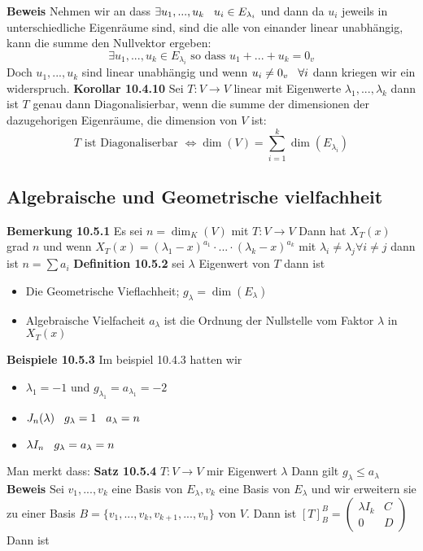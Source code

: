 \documentclass{article}
\newcommand{\smspc}{\hspace{0.3cm}}
\begin{document}
\newline\textbf{Beweis} Nehmen wir an dass $\exists u_1,...,u_k\smspc u_i\in E_{\lambda_i}$ und dann da $u_i$ jeweils in unterschiedliche Eigenräume sind, sind die alle von einander linear unabhängig, kann die summe den Nullvektor ergeben:\[\exists u_1,...,u_k\in E_{\lambda_i}\text{ so dass } u_1+...+u_k=0_v\]
Doch $u_1,...,u_k$ sind linear unabhängig und wenn $u_i\neq 0_v\smspc \forall i$ dann kriegen wir ein widerspruch.
\newline \textbf{Korollar 10.4.10} Sei $T:V\rightarrow V$ linear mit Eigenwerte $\lambda_1,...,\lambda_k$ dann ist $T$ genau dann Diagonalisierbar, wenn die summe der dimensionen der dazugehorigen Eigenräume, die dimension von $V$ ist: \[T \text{ ist Diagonaliserbar }\Leftrightarrow\dim(V)=\sum_{i=1}^k\dim(E_{\lambda_i})\] 
\subsection{Algebraische und Geometrische vielfachheit}
\textbf{Bemerkung 10.5.1} Es sei $n=\dim_K(V)$ mit $T:V\rightarrow V$ Dann hat $X_T(x)$ grad $n$ und wenn $X_T(x)=(\lambda_1-x)^{a_1}\cdot...\cdot (\lambda_k-x)^{a_k}$ mit $\lambda_i\neq\lambda_j\forall i\neq j$ dann ist $n=\sum a_i$
\newline\textbf{Definition 10.5.2} sei $\lambda$ Eigenwert von $T$ dann ist \begin{itemize}
  \item{Die Geometrische Vieflachheit; $g_\lambda=\dim(E_\lambda)$}
  \item{Algebraische Vielfacheit $a_\lambda$ ist die Ordnung der Nullstelle vom Faktor $\lambda$ in $X_T(x)$}
\end{itemize}
\textbf{Beispiele 10.5.3} Im beispiel 10.4.3 hatten wir \begin{itemize}\item{$\lambda_1=-1$ und $g_{\lambda_1}=a_{\lambda_1}=-2$}
  \item{$J_n(\lambda)\smspc g_{\lambda}=1\smspc a_\lambda=n$}
  \item{$\lambda I_n \smspc g_\lambda=a_\lambda=n$}
\end{itemize}
Man merkt dass:
\newline\textbf{Satz 10.5.4} $T:V\rightarrow V$ mir Eigenwert $\lambda$ Dann gilt $g_\lambda\le a_\lambda$
\newline\textbf{Beweis} Sei $v_1,...,v_k$ eine Basis von $E_\lambda,v_k$ eine Basis von $E_\lambda$ und wir erweitern sie zu einer Basis $B=\lbrace v_1,...,v_k,v_{k+1},...,v_n\rbrace$ von $V$. Dann ist $[T]^B_B=\begin{pmatrix}\lambda I_k&C\\0&D\end{pmatrix}$ Dann ist
\end{document}
